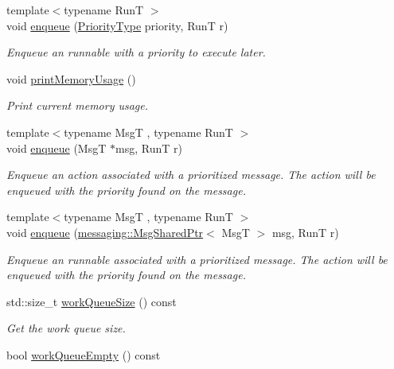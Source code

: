 \begin{DoxyCompactItemize}
{\footnotesize template$<$typename RunT $>$ }\\void \hyperlink{structvt_1_1sched_1_1_scheduler_a0bdc94a90457db0a1cf1e64bd463e927}{enqueue} (\hyperlink{namespacevt_a86bff9f556eb761b27fc8600d006ac04}{Priority\+Type} priority, RunT r)
\begin{DoxyCompactList}\small\item\em Enqueue an runnable with a priority to execute later. \end{DoxyCompactList}\item 
void \hyperlink{structvt_1_1sched_1_1_scheduler_a48a6fdb0c7384df09b467c0e68ca8e6f}{print\+Memory\+Usage} ()
\begin{DoxyCompactList}\small\item\em Print current memory usage. \end{DoxyCompactList}\item 
{\footnotesize template$<$typename MsgT , typename RunT $>$ }\\void \hyperlink{structvt_1_1sched_1_1_scheduler_af7c602c560b0a38451e3a020dbc9dd5b}{enqueue} (MsgT $\ast$msg, RunT r)
\begin{DoxyCompactList}\small\item\em Enqueue an action associated with a prioritized message. The action will be enqueued with the priority found on the message. \end{DoxyCompactList}\item 
{\footnotesize template$<$typename MsgT , typename RunT $>$ }\\void \hyperlink{structvt_1_1sched_1_1_scheduler_ad513c8019078c1b87de81af17df5e920}{enqueue} (\hyperlink{structvt_1_1messaging_1_1_msg_shared_ptr}{messaging\+::\+Msg\+Shared\+Ptr}$<$ MsgT $>$ msg, RunT r)
\begin{DoxyCompactList}\small\item\em Enqueue an runnable associated with a prioritized message. The action will be enqueued with the priority found on the message. \end{DoxyCompactList}\item 
std\+::size\+\_\+t \hyperlink{structvt_1_1sched_1_1_scheduler_a6ee315ffd90f37a277bb2b5622af1f4f}{work\+Queue\+Size} () const
\begin{DoxyCompactList}\small\item\em Get the work queue size. \end{DoxyCompactList}\item 
bool \hyperlink{structvt_1_1sched_1_1_scheduler_a49bfd7d4a6d187c6c995b84885a1ed19}{work\+Queue\+Empty} () const

\end{DoxyCompactItemize}
